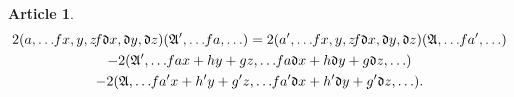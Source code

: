 \documentclass[12pt,a4paper]{article}
\theoremstyle{definition}
\newtheorem{art}{Article}[section]
\begin{document}
\begin{art}
\begin{multline*}
2(a, \ldots \hspace{-2pt} fx, y, z \hspace{-2pt} f\mathfrak{d}x, \mathfrak{d}y, \mathfrak{d}z)(\mathfrak{A}', \ldots \hspace{-2pt} fa, \ldots) = 2(a', \ldots \hspace{-2pt} fx, y, z \hspace{-2pt} f\mathfrak{d}x, \mathfrak{d}y, \mathfrak{d}z)(\mathfrak{A}, \ldots \hspace{-2pt} fa', \ldots) \\
- 2(\mathfrak{A}', \ldots \hspace{-2pt} fax + hy + gz, \ldots \hspace{-2pt} fa\mathfrak{d}x + h\mathfrak{d}y + g\mathfrak{d}z, \ldots) \\
- 2(\mathfrak{A}, \ldots \hspace{-2pt} fa'x + h'y + g'z, \ldots \hspace{-2pt} fa'\mathfrak{d}x + h'\mathfrak{d}y + g'\mathfrak{d}z, \ldots).
\end{multline*}
\end{art}
\end{document}
